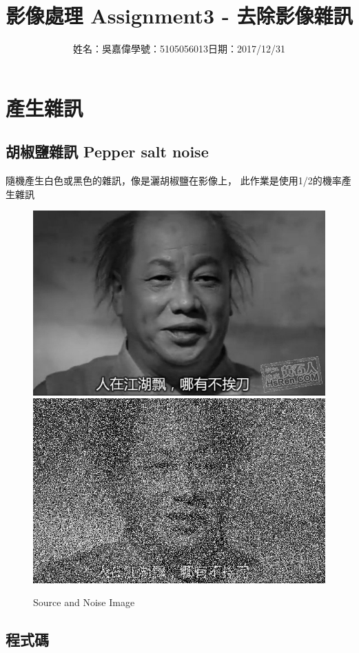 \documentclass[12pt,a4paper]{article}
\title{\huge 影像處理 Assignment3 - 去除影像雜訊} %
\author{姓名：吳嘉偉\quad 學號：5105056013\quad 日期：2017/12/31} %
\date{} %
\begin{document}
\clearpage

\maketitle %

\section{產生雜訊}

\subsection{胡椒鹽雜訊 Pepper salt noise}

{
\fontsize{14pt}{10pt} %
\selectfont %
隨機產生白色或黑色的雜訊，像是灑胡椒鹽在影像上，
此作業是使用1/2的機率產生雜訊
\begin{figure}[ht]
\centering
\includegraphics[width=.5\textwidth]{image/gray_image.png}
\hspace{1cm}
\includegraphics[width=.5\textwidth]{image/noise_Image.png}
\caption{Source and Noise Image}%
\label{要合併的兩張圖}%
\end{figure}
}

\newpage %
\subsection{程式碼}
\end{document}

